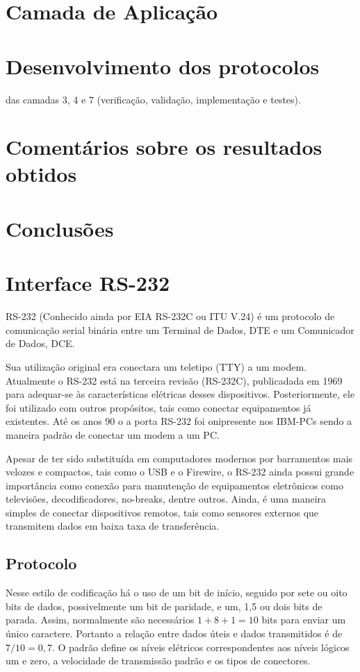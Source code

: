 \documentclass[brazil,times,12pt]{abnt}
\begin{document}
\section*{Camada de Aplicação}

\section*{Desenvolvimento dos protocolos}
 das camadas 3, 4 e 7 (verificação,
validação, implementação e testes).

\section*{Comentários sobre os resultados obtidos}

\section*{Conclusões}



\section*{Interface RS-232}
	RS-232 (Conhecido ainda por EIA RS-232C ou ITU V.24) é um protocolo de
	comunicação serial binária entre um Terminal de Dados, DTE e um Comunicador de
	Dados, DCE. \cite{wiki:rs232}

	Sua utilização original era conectara um teletipo (TTY) a um modem. Atualmente
	o RS-232 está na terceira revisão (RS-232C), publicadada em 1969 para
	adequar-se às características elétricas desses dispositivos. Posteriormente,
	ele foi utilizado com outros propósitos, tais como conectar equipamentos já
	existentes. Até os anos 90 o a porta RS-232 foi onipresente nos IBM-PCs sendo a
	maneira padrão de conectar um modem a um PC.
	
	Apesar de ter sido substituída em computadores modernos por barramentos mais
	velozes e compactos, tais como o USB e o Firewire, o RS-232 ainda possui grande
	importância como conexão para manutenção de equipamentos eletrônicos como
	televisões, decodificadores, no-breaks, dentre outros. Ainda, é uma maneira
	simples de conectar dispositivos remotos, tais como sensores externos que
	transmitem dados em baixa taxa de transferência.
	
	\subsection*{Protocolo}
	Nesse estilo de codificação há o uso de um bit de início, seguido por sete ou
	oito bits de dados, possivelmente um bit de paridade, e um, 1,5 ou dois bits de
	parada. Assim, normalmente são necessários $1 + 8 + 1 = 10$ bits para enviar um
	único caractere. Portanto a relação entre dados úteis e dados transmitidos é de
	$7/10 = 0,7$. O padrão define os níveis elétricos correspondentes aos níveis
	lógicos um e zero, a velocidade de transmissão padrão e os tipos de
	conectores.\cite{strangio:rs232-standard}
	
\end{document}
